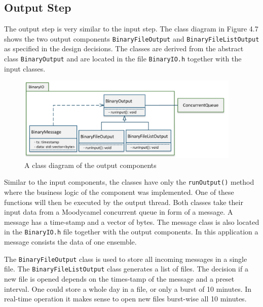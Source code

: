 \subsection{Output Step}
The output step is very similar to the input step. The class diagram in Figure 4.7 shows the two output components \texttt{BinaryFileOutput} and \texttt{BinaryFileListOutput} as specified in the design decisions. The classes are derived from the abstract class \texttt{BinaryOutput} and are located in the file \texttt{BinaryIO.h} together with the input classes.
\vspace{3em}
\begin{figure}[ht]
\centering
      \includegraphics[width=0.95\textwidth]{output}
        \caption{A class diagram of the output components}
\end{figure}
\vspace{3em}
Similar to the input components, the classes have only the \texttt{runOutput()} method where the business logic of the component was implemented. One of these functions will then be executed by the output thread. Both classes take their input data from a Moodycamel concurrent queue in form of a message. A message has a time-stamp and a vector of bytes. The message class is also located in the \texttt{BinaryIO.h} file together with the output components. In this application a message consists the data of one ensemble.

The \texttt{BinaryFileOutput} class is used to store all incoming messages in a single file. The \texttt{BinaryFileListOutput} class generates a list of files. The decision if a new file is opened depends on the times-tamp of the message and a preset interval. One could store a whole day in a file, or only a burst of 10 minutes. In real-time operation it makes sense to open new files burst-wise all 10 minutes.